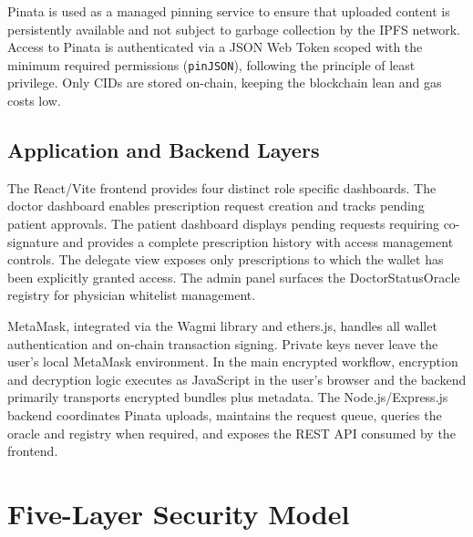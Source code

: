 \documentclass[12pt,a4wide]{report}
\begin{document}
Pinata is used as a managed pinning service to ensure that uploaded content
is persistently available and not subject to garbage collection by the IPFS
network. Access to Pinata is authenticated via a JSON Web Token scoped with
the minimum required permissions (\texttt{pinJSON}), following the principle of
least privilege. Only CIDs are stored on-chain, keeping the blockchain lean
and gas costs low.

\subsection{Application and Backend Layers}

The React/Vite frontend provides four distinct role specific dashboards. The
doctor dashboard enables prescription request creation and tracks pending patient
approvals. The patient dashboard displays pending requests requiring co-signature
and provides a complete prescription history with access management controls.
The delegate view exposes only prescriptions to which the wallet has been
explicitly granted access. The admin panel surfaces the DoctorStatusOracle
registry for physician whitelist management.

MetaMask, integrated via the Wagmi library and ethers.js, handles all wallet
authentication and on-chain transaction signing. Private keys never leave the
user's local MetaMask environment. In the main encrypted workflow, encryption
and decryption logic executes as JavaScript in the user's browser and the backend
primarily transports encrypted bundles plus metadata. The Node.js/Express.js
backend coordinates Pinata uploads, maintains the request queue, queries the
oracle and registry when required, and exposes the REST API consumed by the
frontend.

\section{Five-Layer Security Model}
\end{document}
